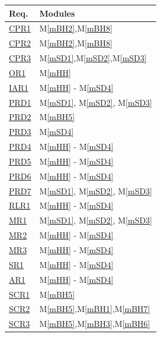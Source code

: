 \documentclass[12pt, titlepage]{article}
\newcommand{\mref}[1]{M\ref{#1}}
\begin{document}
\begin{table}[H]
\centering
\begin{tabular}{p{} p{}}
\toprule
\textbf{Req.} & \textbf{Modules}\\
\midrule
  \href{../../SRS/SRS.pdf#FROneOne}{ CPR1 } & \mref{mBH2},\mref{mBH8}\\
  \href{../../SRS/SRS.pdf#FROneOne}{ CPR2 } & \mref{mBH2},\mref{mBH8}\\
  \href{../../SRS/SRS.pdf#FROneOne}{ CPR3 } & \mref{mSD1},\mref{mSD2},\mref{mSD3}\\
  \href{../../SRS/SRS.pdf#FROneOne}{ OR1 } & \mref{mHH}\\
  \href{../../SRS/SRS.pdf#FROneOne}{ IAR1 } & \mref{mHH} - \mref{mSD4}\\
  \href{../../SRS/SRS.pdf#FROneOne}{ PRD1 } & \mref{mSD1}, \mref{mSD2}, \mref{mSD3}\\
  \href{../../SRS/SRS.pdf#FROneOne}{ PRD2 } & \mref{mBH5}\\
  \href{../../SRS/SRS.pdf#FROneOne}{ PRD3 } & \mref{mSD4}\\
  \href{../../SRS/SRS.pdf#FROneOne}{ PRD4 } & \mref{mHH} - \mref{mSD4}\\
  \href{../../SRS/SRS.pdf#FROneOne}{ PRD5 } & \mref{mHH} - \mref{mSD4}\\
  \href{../../SRS/SRS.pdf#FROneOne}{ PRD6 } & \mref{mHH} - \mref{mSD4}\\
  \href{../../SRS/SRS.pdf#FROneOne}{ PRD7 } & \mref{mSD1}, \mref{mSD2}, \mref{mSD3}\\
  \href{../../SRS/SRS.pdf#FROneOne}{ RLR1 } & \mref{mHH} - \mref{mSD4}\\
  \href{../../SRS/SRS.pdf#FROneOne}{ MR1 } & \mref{mSD1}, \mref{mSD2}, \mref{mSD3}\\
  \href{../../SRS/SRS.pdf#FROneOne}{ MR2 } & \mref{mHH} - \mref{mSD4}\\
  \href{../../SRS/SRS.pdf#FROneOne}{ MR3 } & \mref{mHH} - \mref{mSD4}\\
  \href{../../SRS/SRS.pdf#FROneOne}{ SR1 } & \mref{mHH} - \mref{mSD4}\\
  \href{../../SRS/SRS.pdf#FROneOne}{ AR1 } & \mref{mHH} - \mref{mSD4}\\
  \href{../../SRS/SRS.pdf#FROneOne}{ SCR1 } & \mref{mBH5}\\
  \href{../../SRS/SRS.pdf#FROneOne}{ SCR2 } & \mref{mBH5},\mref{mBH1},\mref{mBH7}\\
  \href{../../SRS/SRS.pdf#FROneOne}{ SCR3 } & \mref{mBH5},\mref{mBH3},\mref{mBH6}\\

\end{tabular}
\end{table}
\end{document}
